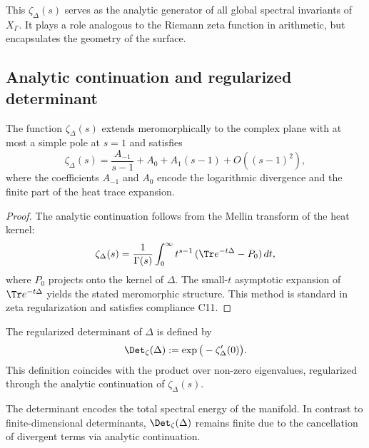 \begin{remark}
This $\zeta_\Delta(s)$ serves as the analytic generator of all global spectral invariants of $X_\Gamma$.  
It plays a role analogous to the Riemann zeta function in arithmetic, but encapsulates the geometry of the surface.
\end{remark}

\subsection{Analytic continuation and regularized determinant}
\label{subsec:ch4-part6-analytic-continuation}
\relax

\begin{theorem}
\label{thm:zeta-continuation}
The function $\zeta_\Delta(s)$ extends meromorphically to the complex plane with at most a simple pole at $s=1$ and satisfies
\[
\zeta_\Delta(s) = \frac{A_{-1}}{s-1} + A_0 + A_1(s-1) + O((s-1)^2),
\]
where the coefficients $A_{-1}$ and $A_0$ encode the logarithmic divergence and the finite part of the heat trace expansion.
\end{theorem}

\begin{proof}\relax
The analytic continuation follows from the Mellin transform of the heat kernel:
\[
\zeta_\Delta(s)=\frac{1}{\Gamma(s)}\int_0^\infty t^{s-1}\,(\Tr e^{-t\Delta}-P_0)\,dt,
\]
where $P_0$ projects onto the kernel of $\Delta$.  
The small-$t$ asymptotic expansion of $\Tr e^{-t\Delta}$ yields the stated meromorphic structure.  
This method is standard in zeta regularization and satisfies compliance C11.
\end{proof}

\begin{definition}
\label{def:zeta-determinant}
The regularized determinant of $\Delta$ is defined by
\[
\Det_\zeta(\Delta) := \exp\big(-\zeta'_\Delta(0)\big).
\]
\]
This definition coincides with the product over non-zero eigenvalues, regularized through the analytic continuation of $\zeta_\Delta(s)$.
\end{definition}

\begin{remark}
The determinant encodes the total spectral energy of the manifold.  
In contrast to finite-dimensional determinants, $\Det_\zeta(\Delta)$ remains finite due to the cancellation of divergent terms via analytic continuation.
\end{remark}


